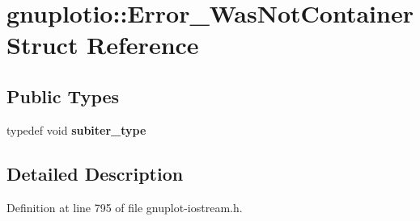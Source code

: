 \hypertarget{structgnuplotio_1_1_error___was_not_container}{}\section{gnuplotio\+:\+:Error\+\_\+\+Was\+Not\+Container Struct Reference}
\label{structgnuplotio_1_1_error___was_not_container}
\subsection*{Public Types}
\begin{DoxyCompactItemize}
\item 
typedef void {\bfseries subiter\+\_\+type}\hypertarget{structgnuplotio_1_1_error___was_not_container_aeac5de90c903be765130fc14f85dfb00}{}\label{structgnuplotio_1_1_error___was_not_container_aeac5de90c903be765130fc14f85dfb00}

\end{DoxyCompactItemize}


\subsection{Detailed Description}


Definition at line 795 of file gnuplot-\/iostream.\+h.

